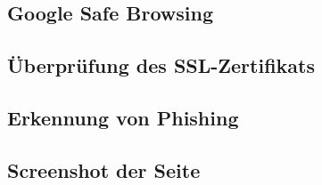 
\subsection{Google Safe Browsing}


\subsection{Überprüfung des SSL-Zertifikats}


\subsection{Erkennung von Phishing}


\subsection{Screenshot der Seite}

